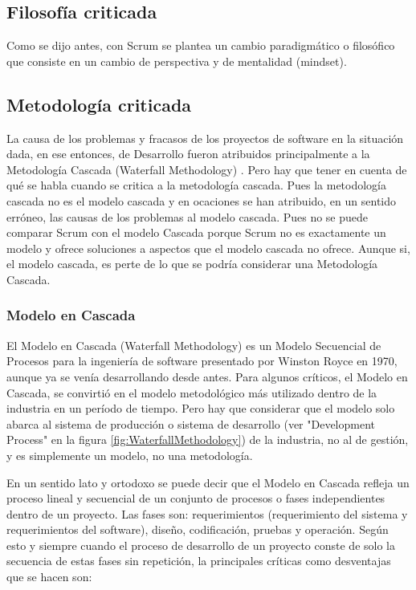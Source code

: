 \subsection{Filosofía criticada}

Como se dijo antes, con Scrum se plantea un cambio paradigmático o filosófico que consiste en un cambio de perspectiva y de mentalidad (mindset).

\subsection{Metodología criticada}

La causa de los problemas y fracasos de los proyectos de software en la situación dada, en ese entonces, de Desarrollo fueron atribuidos principalmente a la Metodología Cascada (Waterfall Methodology) \cite{Ken-Schwaber-1995}. Pero hay que tener en cuenta de qué se habla cuando se critica a la metodología cascada. Pues la metodología cascada no es el modelo cascada y en ocaciones se han atribuido, en un sentido erróneo, las causas de los problemas al modelo cascada. Pues no se puede comparar Scrum con el modelo Cascada porque Scrum no es exactamente un modelo y ofrece soluciones a aspectos que el modelo cascada no ofrece. Aunque si, el modelo cascada, es perte de lo que se podría considerar una Metodología Cascada. 

\subsubsection{Modelo en Cascada}

El Modelo en Cascada (Waterfall Methodology) \cite{Ken-Schwaber-1995} es un Modelo Secuencial de Procesos para la ingeniería de software presentado por Winston Royce en 1970, aunque ya se venía desarrollando desde antes. Para algunos críticos, el Modelo en Cascada, se convirtió en el modelo metodológico más utilizado dentro de la industria en un período de tiempo. Pero hay que considerar que el modelo solo abarca al sistema de producción o sistema de desarrollo (ver "Development Process" en la figura \ref{fig:WaterfallMethodology}) de la industria, no al de gestión, y es simplemente un modelo, no una metodología.

En un sentido lato y ortodoxo se puede decir que el Modelo en Cascada refleja un proceso lineal y secuencial de un conjunto de procesos o fases independientes dentro de un proyecto. Las fases son: requerimientos (requerimiento del sistema y requerimientos del software), diseño, codificación, pruebas y operación. Según esto y siempre cuando el proceso de desarrollo de un proyecto conste de solo la secuencia de estas fases sin repetición, la principales críticas como desventajas que se hacen son:

